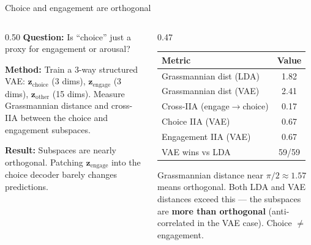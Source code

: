 \documentclass[aspectratio=169,11pt]{beamer}
\begin{document}
\begin{frame}{Choice and engagement are orthogonal}
\begin{columns}[T]
\begin{column}{0.50\textwidth}
\textbf{Question:} Is ``choice'' just a proxy for engagement or arousal?

\vspace{0.5em}
\textbf{Method:} Train a 3-way structured VAE: $\mathbf{z}_{\text{choice}}$ (3 dims), $\mathbf{z}_{\text{engage}}$ (3 dims), $\mathbf{z}_{\text{other}}$ (15 dims). Measure Grassmannian distance and cross-IIA between the choice and engagement subspaces.

\vspace{0.5em}
\textbf{Result:} Subspaces are nearly orthogonal. Patching $\mathbf{z}_{\text{engage}}$ into the choice decoder barely changes predictions.
\end{column}

\begin{column}{0.47\textwidth}
\vspace{0.5em}
{\small
\begin{tabular}{lc}
\toprule
\textbf{Metric} & \textbf{Value} \\
\midrule
Grassmannian dist (LDA) & 1.82 \\
Grassmannian dist (VAE) & 2.41 \\
Cross-IIA (engage$\to$choice) & 0.17 \\
Choice IIA (VAE) & 0.67 \\
Engagement IIA (VAE) & 0.67 \\
VAE wins vs LDA & 59/59 \\
\bottomrule
\end{tabular}
}

\vspace{0.5em}
{\small Grassmannian distance near $\pi/2 \approx 1.57$ means orthogonal. Both LDA and VAE distances exceed this --- the subspaces are \textbf{more than orthogonal} (anti-correlated in the VAE case). Choice $\neq$ engagement.}
\end{column}
\end{columns}
\end{frame}


\begin{frame}[plain]
\vfill
\begin{center}
  \setlength{\fboxrule}{2.5pt}%
\end{center}
\vfill
\end{frame}
\end{document}
